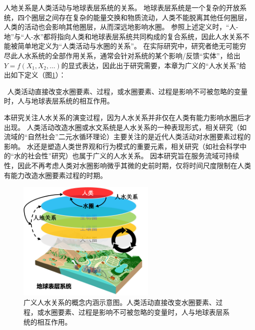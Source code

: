 人地关系是人类活动与地球表层系统的关系\cite{wu1991,li2016d}。
地球表层系统是一个复杂的开放系统，四个圈层之间存在复杂的能量交换和物质流动，人类不能脱离其他任何圈层，人类的活动也会影响其他圈层，从而深远地影响水圈。
参照上述定义时，“人-地”与“人-水”都将指向人类和地球表层系统共同构成的复合系统，因此人\textendash{}水关系不能被简单地定义为“人类活动与水圈的关系”。
在实际研究中，研究者绝无可能穷尽此人\textendash{}水系统的全部作用关系，通常会针对系统的某个影响/反馈“实体”，给出$Y = f(X_1, X_2, \dots)$的显式表达，因此出于研究需要，本章为广义的“人\textendash{}水关系”给出如下定义（图\ref{ch2:fig:definitions}）：

{\kai~人类活动直接改变水圈要素、过程，或水圈要素、过程是影响不可被忽略的变量时，人与地球表层系统的相互作用。}

本研究关注人\textendash{}水关系的演变过程，因为人\textendash{}水关系并非仅在人类有能力影响水圈后才出现。
人类活动改造水圈或水文系统是人\textendash{}水关系的一种表现形式，相关研究（如流域的“自然\textendash{}社会”二元水循环理论）主要关注的是近代人类活动对水圈要素过程的影响\cite{wang2006, wang2016}。
水还是塑造人类世界观和行为模式的重要元素，相关研究（如社会科学中的“水的社会性”研究）也属于广义的人\textendash{}水关系。
因本研究旨在服务流域可持续性，因此不再考虑人类对水圈影响微乎其微的史前时期，仅将时间尺度限制在人类有能力改造水圈要素过程的时期。

\begin{figure}[!ht]
    \centering
    \includegraphics[width=0.6\textwidth]{img/ch2/ch2_scope.png}
    \caption[广义人\textendash{}水关系的概念内涵示意图]{广义人\textendash{}水关系的概念内涵示意图。人类活动直接改变水圈要素、过程，或水圈要素、过程是影响不可被忽略的变量时，人与地球表层系统的相互作用。}\label{ch2:fig:definitions}
\end{figure}


